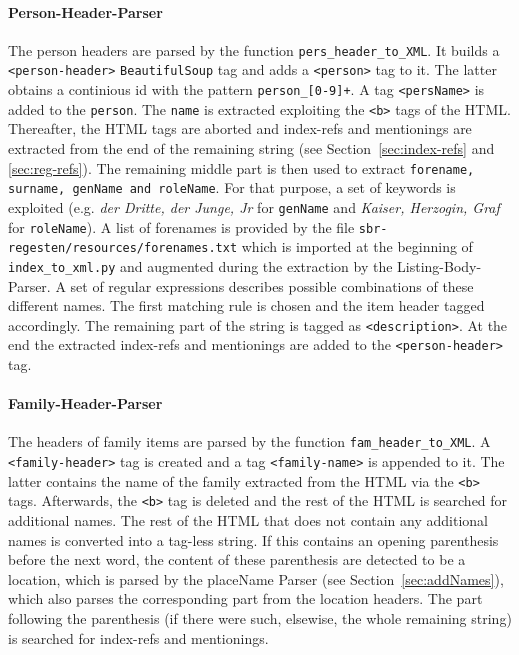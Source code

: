 \paragraph{Person-Header-Parser}
The person headers are parsed by the function
\texttt{pers\_header\_to\_XML}. It builds a \texttt{<person-header>}
\texttt{BeautifulSoup} tag and adds a \texttt{<person>} tag to it. The
latter obtains a continious id with the pattern
\texttt{person\_[0-9]+}. A tag \texttt{<persName>} is added to the
\texttt{person}. The \texttt{name} is extracted exploiting the
\texttt{<b>} tags of the HTML. Thereafter, the HTML tags are aborted
and index-refs and mentionings are extracted from the end of the
remaining string (see Section~\ref{sec:index-refs} and
\ref{sec:reg-refs}). The remaining middle part is then used to extract
\texttt{forename, surname, genName and roleName}. For that purpose, a
set of keywords is exploited (e.g. \textit{der Dritte, der Junge, Jr}
for \texttt{genName} and \textit{Kaiser, Herzogin, Graf} for
\texttt{roleName}). A list of forenames is provided by the file
\texttt{sbr-regesten/resources/forenames.txt} which is imported at the
beginning of \texttt{index\_to\_xml.py} and augmented during the
extraction by the Listing-Body-Parser. A set of regular expressions
describes possible combinations of these different names. The first
matching rule is chosen and the item header tagged accordingly. The
remaining part of the string is tagged as \texttt{<description>}. At
the end the extracted index-refs and mentionings are added to the
\texttt{<person-header>} tag.

\paragraph{Family-Header-Parser}
The headers of family items are parsed by the function
\texttt{fam\_header\_to\_XML}. A \texttt{<family-header>} tag is
created and a tag \texttt{<family-name>} is appended to it. The latter
contains the name of the family extracted from the HTML via the
\texttt{<b>} tags. Afterwards, the \texttt{<b>} tag is deleted and the
rest of the HTML is searched for additional names. The rest of the
HTML that does not contain any additional names is converted into a
tag-less string. If this contains an opening parenthesis before the
next word, the content of these parenthesis are detected to be a
location, which is parsed by the placeName Parser (see
Section~\ref{sec:addNames}), which also parses the corresponding part
from the location headers. The part following the parenthesis (if
there were such, elsewise, the whole remaining string) is searched for
index-refs and mentionings.

